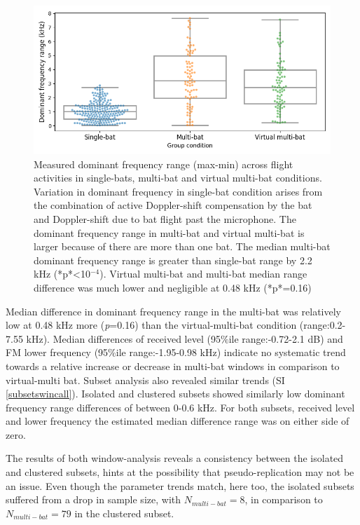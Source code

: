 \documentclass[
]{book}
\begin{document}
\begin{figure}
\includegraphics[width=1\linewidth]{original_papers/hbc-paper/combined_analysis/domfreqranges} \caption{\label{domfreqgraph} Measured dominant frequency range (max-min) across flight activities in single-bats, multi-bat and virtual multi-bat conditions. Variation in dominant frequency in single-bat condition arises from the combination of active Doppler-shift compensation by the bat and Doppler-shift due to bat flight past the microphone. The dominant frequency range in multi-bat and virtual multi-bat is larger because of there are more than one bat. The median multi-bat dominant frequency range is greater than single-bat range by 2.2 kHz (*p*<10$^{-4}$). Virtual multi-bat and multi-bat median range difference was much lower and negligible at 0.48 kHz (*p*=0.16)}\label{fig:domfreqgraph}
\end{figure}

Median difference in dominant frequency range in the multi-bat was relatively low at 0.48 kHz more (\emph{p}=0.16) than the virtual-multi-bat condition (range:0.2-7.55 kHz). Median differences of received level (95\(\%\)ile range:-0.72-2.1 dB) and FM lower frequency (95\(\%\)ile range:-1.95-0.98 kHz) indicate no systematic trend towards a relative increase or decrease in multi-bat windows in comparison to virtual-multi bat. Subset analysis also revealed similar trends (SI \ref{subsetswincall}). Isolated and clustered subsets showed similarly low dominant frequency range differences of between 0-0.6 kHz. For both subsets, received level and lower frequency the estimated median difference range was on either side of zero.

The results of both window-analysis reveals a consistency between the isolated and clustered subsets, hints at the possibility that pseudo-replication may not be an issue. Even though the parameter trends match, here too, the isolated subsets suffered from a drop in sample size, with \(N_{multi-bat}=8\), in comparison to \(N_{multi-bat}=79\) in the clustered subset.
\end{document}

